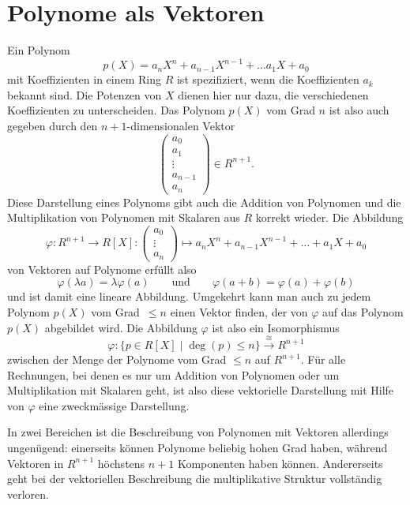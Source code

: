 %
%
%
\section{Polynome als Vektoren
\label{buch:section:polynome:vektoren}}
Ein Polynom
\[
p(X) = a_nX^n + a_{n-1}X^{n-1} + \dots a_1X+a_0
\]
mit Koeffizienten in einem Ring $R$
ist spezifiziert, wenn die Koeffizienten $a_k$ bekannt sind.
Die Potenzen von $X$ dienen hier nur dazu, die verschiedenen
Koeffizienten zu unterscheiden.
Das Polynom $p(X)$ vom Grad $n$ ist also auch gegeben durch den
$n+1$-dimensionalen Vektor
\[
\begin{pmatrix}
a_0\\
a_1\\
\vdots\\
a_{n-1}\\
a_{n}
\end{pmatrix}
\in
R^{n+1}.
\]
Diese Darstellung eines Polynoms gibt auch die Addition von Polynomen
und die Multiplikation von Polynomen mit Skalaren aus $R$ korrekt wieder.
Die Abbildung
\[
\varphi
\colon  R^{n+1} \to R[X]
:
\begin{pmatrix}a_0\\\vdots\\a_n\end{pmatrix}
\mapsto
a_nX^n + a_{n-1}X^{n-1}+\dots+a_1X+a_0
\]
von Vektoren auf Polynome
erfüllt also
\[
\varphi( \lambda a) = \lambda \varphi(a)
\qquad\text{und}\qquad
\varphi(a+b) = \varphi(a) + \varphi(b)
\]
und ist damit eine lineare Abbildung.
Umgekehrt kann man auch zu jedem Polynom $p(X)$ vom Grad~$\le n$ einen
Vektor finden, der von $\varphi$ auf das Polynom $p(X)$ abgebildet wird.
Die Abbildung $\varphi$ ist also ein Isomorphismus
\[
\varphi
\colon
\{p\in R[X] \mid \deg(p) \le n\}
\overset{\cong}{\to}
R^{n+1}
\]
zwischen der Menge
der Polynome vom Grad $\le n$ auf $R^{n+1}$.
Für alle Rechnungen, bei denen es nur um Addition von Polynomen oder
um Multiplikation mit Skalaren geht, ist also diese vektorielle Darstellung
mit Hilfe von $\varphi$ eine zweckmässige Darstellung.

In zwei Bereichen ist die Beschreibung von Polynomen mit Vektoren allerdings
ungenügend: einerseits können Polynome beliebig hohen Grad haben,
während Vektoren in $R^{n+1}$ höchstens $n+1$ Komponenten haben können.
Andererseits geht bei der vektoriellen Beschreibung die multiplikative
Struktur vollständig verloren.

